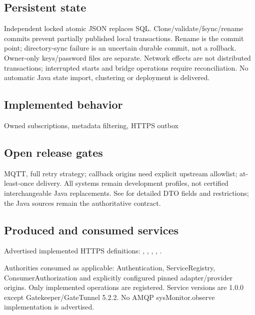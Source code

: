 \documentclass[a4paper]{arrowhead}
\begin{document}
\subsection{Persistent state}
Independent locked atomic JSON replaces SQL. Clone/validate/fsync/rename commits prevent partially published local transactions. Rename is the commit point; directory-sync failure is an uncertain durable commit, not a rollback. Owner-only keys/password files are separate. Network effects are not distributed transactions; interrupted starts and bridge operations require reconciliation. No automatic Java state import, clustering or deployment is delivered.
\subsection{Implemented behavior}
Owned subscriptions, metadata filtering, HTTPS outbox
\subsection{Open release gates}
MQTT, full retry strategy; callback origins need explicit upstream allowlist; at-least-once delivery. All systems remain development profiles, not certified interchangeable Java replacements. See  for detailed DTO fields and restrictions; the Java sources remain the authoritative contract.
\subsection{Produced and consumed services}
Advertised implemented HTTPS definitions: , \allowbreak {}, \allowbreak {}, \allowbreak {}, \allowbreak {}.\par
Authorities consumed as applicable: Authentication, ServiceRegistry, ConsumerAuthorization and explicitly configured pinned adapter/provider origins. Only implemented operations are registered. Service versions are 1.0.0 except Gatekeeper/GateTunnel 5.2.2. No AMQP sysMonitor.observe implementation is advertised.
\clearpage
\end{document}
